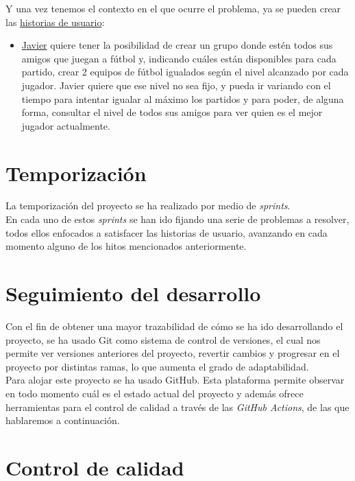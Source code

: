 Y una vez tenemos el contexto en el que ocurre el problema, ya se pueden crear las \href{https://github.com/manujurado1/SportsBar-IV/labels/user-stories}{historias de usuario}:

\begin{itemize}
    \item \href{https://github.com/manujurado1/SportsBar-IV/issues/107}{Javier} quiere tener la posibilidad de crear un grupo donde estén todos sus amigos que juegan a fútbol y, indicando cuáles están disponibles para cada partido, crear 2
    equipos de fútbol igualados según el nivel alcanzado por cada jugador. Javier quiere que ese nivel no sea fijo, y pueda ir variando con el tiempo para intentar igualar
    al máximo los partidos y para poder, de alguna forma, consultar el nivel de todos sus amigos para ver quien es el mejor jugador actualmente.
\end{itemize}

\newpage
\section{Temporización}

La temporización del proyecto se ha realizado por medio de \textit{sprints}.\\

En cada uno de estos \textit{sprints} se han ido fijando una serie de problemas a resolver, todos ellos enfocados a satisfacer las historias de usuario, avanzando en cada momento
alguno de los hitos mencionados anteriormente.


\section{Seguimiento del desarrollo}

Con el fin de obtener una mayor trazabilidad de cómo se ha ido desarrollando el proyecto, se ha usado Git como sistema de control de versiones, el cual nos permite ver versiones anteriores
del proyecto, revertir cambios y progresar en el proyecto por distintas ramas, lo que aumenta el grado de adaptabilidad.\\

Para alojar este proyecto se ha usado GitHub. Esta plataforma permite observar en todo momento cuál es el estado actual del proyecto y además ofrece herramientas para el control de calidad
a través de las \textit{GitHub Actions}, de las que hablaremos a continuación.


\section {Control de calidad}

